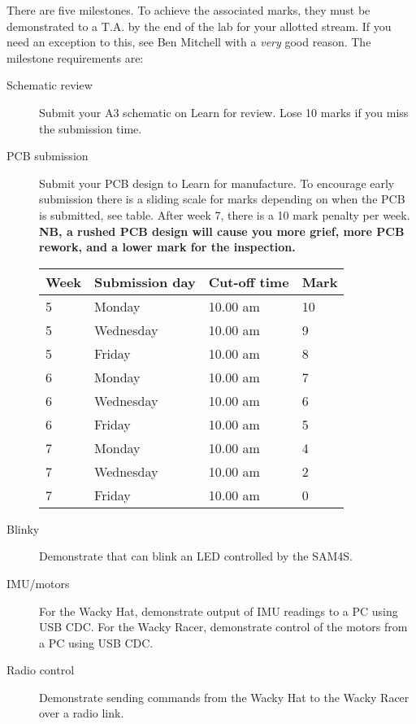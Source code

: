 \documentclass[11pt, a4paper]{article}
\begin{document}
There are five milestones.  To achieve the associated marks, they must
be demonstrated to a T.A. by the end of the lab for your allotted
stream.  If you need an exception to this, see Ben Mitchell with a
\emph{very} good reason.  The milestone requirements are:
%
\begin{description}
\item [Schematic review] Submit your A3 schematic on Learn for
  review.  Lose 10 marks if you miss the submission time.

\item [PCB submission] Submit your PCB design to Learn for
  manufacture.  To encourage early submission there is a sliding scale
  for marks depending on when the PCB is submitted, see table.  After
  week 7, there is a 10 mark penalty per week.  \textbf{NB, a rushed
    PCB design will cause you more grief, more PCB rework, and a lower
    mark for the inspection.}

  \begin{tabular}{llll}
    Week & Submission day & Cut-off time  & Mark \\ \hline
    5    & Monday       & 10.00 am & 10 \\
    5    & Wednesday    & 10.00 am & 9 \\
    5    & Friday       & 10.00 am & 8 \\
    6    & Monday       & 10.00 am & 7 \\
    6    & Wednesday    & 10.00 am & 6 \\
    6    & Friday       & 10.00 am & 5  \\
    7    & Monday       & 10.00 am & 4 \\
    7    & Wednesday    & 10.00 am & 2 \\
    7    & Friday       & 10.00 am & 0 \\        
  \end{tabular}

\item [Blinky] Demonstrate that can blink an LED controlled by the SAM4S.
  
\item [IMU/motors] For the Wacky Hat, demonstrate output of IMU
  readings to a PC using USB CDC.  For the Wacky Racer, demonstrate
  control of the motors from a PC using USB CDC.

\item[Radio control] Demonstrate sending commands from the Wacky Hat
  to the Wacky Racer over a radio link.
\end{description}
\end{document}
